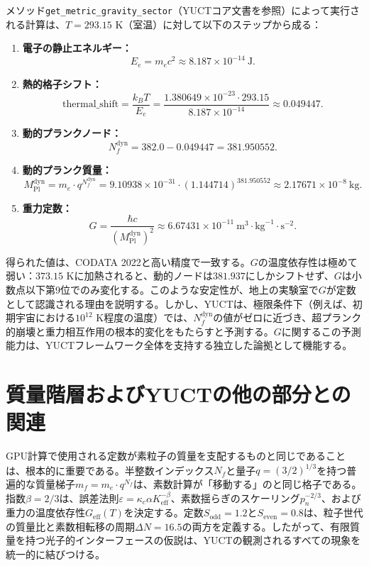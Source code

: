 \documentclass[11pt,a4paper]{article}
\begin{document}
	メソッド\texttt{get\_metric\_gravity\_sector}（YUCTコア文書を参照）によって実行される計算は、$T = 293.15$ K（室温）に対して以下のステップから成る：
	
	\begin{enumerate}
		\item \textbf{電子の静止エネルギー：}
		\begin{equation}
			E_e = m_e c^2 \approx 8.187 \times 10^{-14}~\text{J}.
		\end{equation}
		\item \textbf{熱的格子シフト：}
		\begin{equation}
			\text{thermal\_shift} = \frac{k_B T}{E_e} = \frac{1.380649 \times 10^{-23} \cdot 293.15}{8.187 \times 10^{-14}} \approx 0.049447.
		\end{equation}
		\item \textbf{動的プランクノード：}
		\begin{equation}
			N_f^{\text{dyn}} = 382.0 - 0.049447 = 381.950552.
		\end{equation}
		\item \textbf{動的プランク質量：}
		\begin{equation}
			M_{\text{Pl}}^{\text{dyn}} = m_e \cdot q^{N_f^{\text{dyn}}} = 9.10938 \times 10^{-31} \cdot (1.144714)^{381.950552} \approx 2.17671 \times 10^{-8}~\text{kg}.
		\end{equation}
		\item \textbf{重力定数：}
		\begin{equation}
			G = \frac{\hbar c}{(M_{\text{Pl}}^{\text{dyn}})^2} \approx 6.67431 \times 10^{-11}~\text{m}^3\!\cdot\!\text{kg}^{-1}\!\cdot\!\text{s}^{-2}.
		\end{equation}
	\end{enumerate}
	
	得られた値は、CODATA 2022と高い精度で一致する。$G$の温度依存性は極めて弱い：$373.15$ Kに加熱されると、動的ノードは$381.937$にしかシフトせず、$G$は小数点以下第9位でのみ変化する。このような安定性が、地上の実験室で$G$が定数として認識される理由を説明する。しかし、YUCTは、極限条件下（例えば、初期宇宙における$10^{12}$ K程度の温度）では、$N_f^{\text{dyn}}$の値がゼロに近づき、超プランク的崩壊と重力相互作用の根本的変化をもたらすと予測する。$G$に関するこの予測能力は、YUCTフレームワーク全体を支持する独立した論拠として機能する。
	
	\section{質量階層およびYUCTの他の部分との関連}
	GPU計算で使用される定数が素粒子の質量を支配するものと同じであることは、根本的に重要である。半整数インデックス$N_f$と量子$q = (3/2)^{1/3}$を持つ普遍的な質量梯子$m_f = m_e \cdot q^{N_f}$は、素数計算が「移動する」のと同じ格子である。指数$\beta = 2/3$は、誤差法則$\varepsilon = \kappa_c \alpha K_{\mathrm{eff}}^{-\beta}$、素数揺らぎのスケーリング$p_n^{-2/3}$、および重力の温度依存性$G_{\mathrm{eff}}(T)$を決定する。定数$S_{\mathrm{odd}} = 1.2$と$S_{\mathrm{even}} = 0.8$は、粒子世代の質量比と素数相転移の周期$\Delta N = 16.5$の両方を定義する。したがって、有限質量を持つ光子的インターフェースの仮説は、YUCTの観測されるすべての現象を統一的に結びつける。
	
\end{document}
